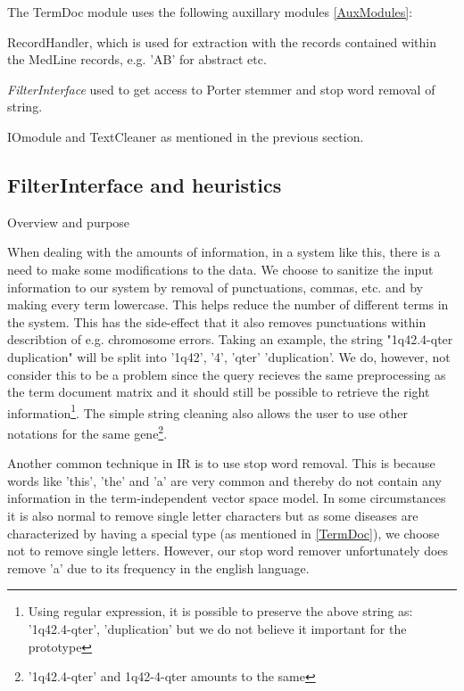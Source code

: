 The TermDoc module uses the following auxillary modules
\ref{AuxModules}:

RecordHandler, which is used for extraction with the records contained
within the MedLine records, e.g. 'AB' for abstract etc.

\textit{FilterInterface} used to get access to Porter stemmer and stop
word removal of string.

IOmodule and TextCleaner as mentioned in the previous section.


\subsection{FilterInterface and heuristics}

Overview and purpose

When dealing with the amounts of information, in a system like this,
there is a need to make some modifications to the data. We choose to
sanitize the input information to our system by removal of
punctuations, commas, etc. and by making every term lowercase. This
helps reduce the number of different terms in the system. This has the
side-effect that it also removes punctuations within describtion of
e.g. chromosome errors. Taking an example, the string "1q42.4-qter
duplication" will be split into '1q42', '4', 'qter' 'duplication'. We
do, however, not consider this to be a problem since the query
recieves the same preprocessing as the term document matrix and it
should still be possible to retrieve the right
information\footnote{Using regular expression, it is possible to
  preserve the above string as: '1q42.4-qter', 'duplication' but we do
  not believe it important for the prototype}. The simple string
cleaning also allows the user to use other notations for the same
gene\footnote{'1q42.4-qter' and 1q42-4-qter amounts to the same}.

Another common technique in IR is to use stop word removal. This is
because words like 'this', 'the' and 'a' are very common and thereby
do not contain any information in the term-independent vector space
model. In some circumstances it is also normal to remove single letter
characters but as some diseases are characterized by having a special
type (as mentioned in \ref{TermDoc}), we choose not to remove single
letters. However, our stop word remover unfortunately does remove 'a'
due to its frequency in the english language.



